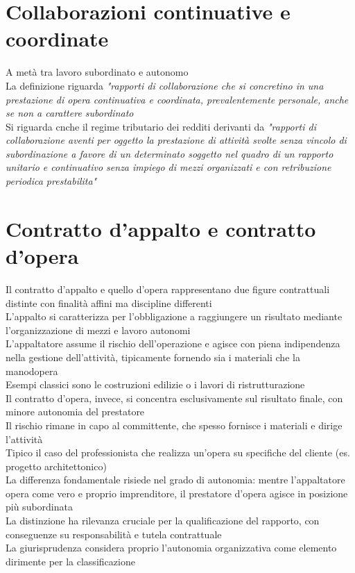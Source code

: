 \documentclass[8pt,oneside,a4paper]{article}
\begin{document}
	\section{Collaborazioni continuative e coordinate}
	A metà tra lavoro subordinato e autonomo\\
	La definizione riguarda \textit{"rapporti di collaborazione che si concretino in una prestazione di opera continuativa e coordinata, prevalentemente personale, anche se non a carattere subordinato}\\
	Si riguarda cnche il regime tributario dei redditi derivanti da \textit{"rapporti di collaborazione aventi per oggetto la prestazione di attività svolte senza vincolo di subordinazione a favore di un determinato soggetto nel quadro di un rapporto unitario e continuativo senza impiego di mezzi organizzati e con retribuzione periodica prestabilita"}\\
	\section{Contratto d'appalto e contratto d'opera}
	Il contratto d'appalto e quello d'opera rappresentano due figure contrattuali distinte con finalità affini ma discipline differenti\\
	L'appalto si caratterizza per l'obbligazione a raggiungere un risultato mediante l'organizzazione di mezzi e lavoro autonomi\\
	L'appaltatore assume il rischio dell'operazione e agisce con piena indipendenza nella gestione dell'attività, tipicamente fornendo sia i materiali che la manodopera\\
	Esempi classici sono le costruzioni edilizie o i lavori di ristrutturazione\\
	Il contratto d'opera, invece, si concentra esclusivamente sul risultato finale, con minore autonomia del prestatore\\
	Il rischio rimane in capo al committente, che spesso fornisce i materiali e dirige l'attività\\
	Tipico il caso del professionista che realizza un'opera su specifiche del cliente (es. progetto architettonico)\\
	La differenza fondamentale risiede nel grado di autonomia: mentre l'appaltatore opera come vero e proprio imprenditore, il prestatore d'opera agisce in posizione più subordinata\\
	La distinzione ha rilevanza cruciale per la qualificazione del rapporto, con conseguenze su responsabilità e tutela contrattuale\\
	La giurisprudenza considera proprio l'autonomia organizzativa come elemento dirimente per la classificazione
\end{document}
